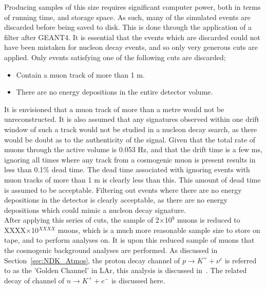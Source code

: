 Producing samples of this size requires significant computer power, both in terms of running time, and storage space. As such, many of the simulated events are discarded before being saved to disk. This is done through the application of a filter after GEANT4. It is essential that the events which are discarded could not have been mistaken for nucleon decay events, and so only very generous cuts are applied. Only events satisfying one of the following cuts are discarded;
\begin{itemize}
\item Contain a muon track of more than 1 m.
\item There are no energy depositions in the entire detector volume.
\end{itemize}
It is envisioned that a muon track of more than a metre would not be unreconstructed. It is also assumed that any signatures observed within one drift window of such a track would not be studied in a nucleon decay search, as there would be doubt as to the authenticity of the signal. Given that the total rate of muons through the active volume is 0.053 Hz, and that the drift time is a few ms, ignoring all times where any track from a cosmogenic muon is present results in less than 0.1\% dead time. The dead time associated with ignoring events with muon tracks of more than 1 m is clearly less than this. This amount of dead time is assumed to be acceptable. Filtering out events where there are no energy depositions in the detector is clearly acceptable, as there are no energy depositions which could mimic a nucleon decay signature. \\

After applying this series of cuts, the sample of 2$\times$10$^9$ muons is reduced to XXXX$\times$10$^{XXXX}$ muons, which is a much more reasonable sample size to store on tape, and to perform analyses on. It is upon this reduced sample of muons that the cosmogenic background analyses are performed. As discussed in Section~\ref{sec:NDK_Atmos}, the proton decay channel of $p \rightarrow K^{+} + \nu^{e}$ is referred to as the 'Golden Channel' in LAr, this analysis is discussed in~\citep{NDKTFNote}. The related decay of channel of $n \rightarrow K^{+} + e^{-}$ is discussed here. \\

